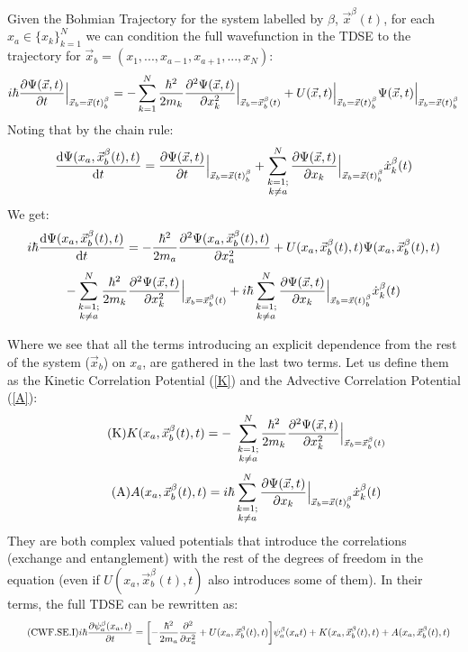 \documentclass[11pt, a4paper]{article} %
\begin{document}
Given the Bohmian Trajectory for the system labelled by $\beta$, $\vec{x}^\beta(t)$, for each $x_a\in\{x_k\}_{k=1}^N$ we can condition the full wavefunction in the TDSE to the trajectory for $\vec{x}_b=(x_1,...,x_{a-1},x_{a+1},...,x_N)$:
$$
i\hbar \pdv{\Psi(\vec{x}, t)}{t}\Big\rvert_{\vec{x}_b=\vec{x}(t)_b^\beta} = - \sum_{k=1}^{N} \frac{\hbar^2}{2m_k}\pdv[2]{\Psi(\vec{x},t)}{x_k}\Big\rvert_{\vec{x}_b=\vec{x}_b^\beta(t)} + U(\vec{x},t)\Big\rvert_{\vec{x}_b=\vec{x}(t)_b^\beta}\Psi(\vec{x},t)\Big\rvert_{\vec{x}_b=\vec{x}(t)_b^\beta}
$$
Noting that by the chain rule:
$$
\dv{\Psi(x_a, \vec{x}_b^\beta(t), t)}{t} = \pdv{\Psi(\vec{x}, t)}{t}\Big\rvert_{\vec{x}_b=\vec{x}(t)_b^\beta} + \sum_{\substack{k=1; \\ k\neq a}}^{N} \pdv{\Psi(\vec{x}, t)}{x_k}\Big\rvert_{\vec{x}_b=\vec{x}(t)_b^\beta} \dot{x}_k^\beta(t)
$$
We get:\vspace{-0.3cm}
$$
i\hbar \dv{\Psi(x_a, \vec{x}_b^\beta(t), t)}{t} = - \frac{\hbar^2}{2m_a}\pdv[2]{\Psi(x_a, \vec{x}_b^\beta(t), t)}{x_a} + U(x_a, \vec{x}_b^\beta(t), t)\Psi(x_a, \vec{x}_b^\beta(t), t) 
$$
$$
- \sum_{\substack{k=1; \\ k\neq a}}^{N} \frac{\hbar^2}{2m_k}\pdv[2]{\Psi(\vec{x},t)}{x_k}\Big\rvert_{\vec{x}_b=\vec{x}_b^\beta(t)} + i \hbar  \sum_{\substack{k=1; \\ k\neq a}}^{N} \pdv{\Psi(\vec{x}, t)}{x_k}\Big\rvert_{\vec{x}_b=\vec{x}(t)_b^\beta} \dot{x}_k^\beta(t)\vspace{-0.2cm}
$$

Where we see that all the terms introducing an explicit dependence from the rest of the system ($\vec{x}_b$) on $x_a$, are gathered in the last two terms. Let us define them as the Kinetic Correlation Potential (\ref{K}) and the Advective Correlation Potential (\ref{A}):\vspace{-0.2cm}
\begin{equation}\label{K}\tag{K}
K(x_a, \vec{x}_b^\beta(t), t) = - \ \sum_{\substack{k=1; \\ k\neq a}}^{N} \frac{\hbar^2}{2m_k}\pdv[2]{\Psi(\vec{x},t)}{x_k}\Big\rvert_{\vec{x}_b=\vec{x}_b^\beta(t)}
\end{equation}
\begin{equation}\label{A}\tag{A}
A(x_a, \vec{x}_b^\beta(t), t) =  i \hbar  \sum_{\substack{k=1; \\ k\neq a}}^{N} \pdv{\Psi(\vec{x}, t)}{x_k}\Big\rvert_{\vec{x}_b=\vec{x}(t)_b^\beta} \dot{x}_k^\beta(t)
\end{equation}
They are both complex valued potentials that introduce the correlations (exchange and entanglement) with the rest of the degrees of freedom in the equation (even if $U(x_a, \vec{x}_b^\beta(t), t)$ also introduces some of them). In their terms, the full TDSE can be rewritten as:
\begin{equation*}\label{CWF.SE.I}\tag{CWF.SE.I}
i\hbar \pdv{\psi_a^\beta(x_a, t)}{t} = \qty[- \frac{\hbar^2}{2m_a}\pdv[2]{}{x_a} + U(x_a, \vec{x}_b^\beta(t), t)]\psi_a^\beta(x_a t) + K(x_a, \vec{x}_b^\beta(t), t) +A(x_a, \vec{x}_b^\beta(t), t) \quad
\end{equation*}
\end{document}
